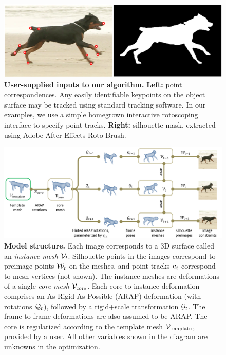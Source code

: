 \documentclass[preprint]{acmsiggraph}
\begin{document}
\begin{figure}
\includegraphics[width=\linewidth]{figures/fig-inputs.png}
\caption{\textbf{User-supplied inputs to our algorithm.}  \textbf{Left:} point correspondences.  Any easily identifiable keypoints on the object surface may be tracked using standard tracking software.  In our examples, we use a simple homegrown interactive rotoscoping interface to specify point tracks.  \textbf{Right:} silhouette mask, extracted using Adobe After Effects Roto Brush.
}
\label{fig:inputs}
\end{figure}

\begin{figure}
\begin{center}
\includegraphics[width=.9\linewidth]{figures/fig2}
\end{center}
\caption{\label{fig:diagram}  
\textbf{Model structure.}
Each image corresponds to a 3D surface called an {\em instance mesh} $\mathcal{V}_t$. Silhouette points in the images correspond to preimage points $\mathcal{W}_t$ on the meshes, and point tracks $\mathbf{c}_t$ correspond to mesh vertices (not shown).
The instance meshes are deformations of a single {\em core mesh} $\mathcal{V}_{\text{core}}$. Each core-to-instance deformation comprises an As-Rigid-As-Possible (ARAP) deformation (with rotations $\mathcal{Q}_t$), followed by a rigid+scale transformation $\mathcal{G}_t$. The frame-to-frame deformations are also assumed to be ARAP. The core is regularized according to the template mesh $\mathcal{V}_{\text{template}}$, provided by a user. All other variables shown in the diagram are unknowns in the optimization.
}
\end{figure}
\end{document}
